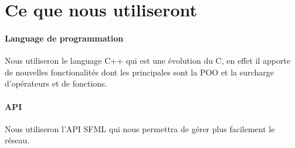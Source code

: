 \documentclass[12pt,a4paper,twoside]{article}
\begin{document}
    \section{Ce que nous utiliseront}

    \paragraph*{Language de programmation\\}
    Nous utiliseron le language C++ qui est une évolution du C, en effet il apporte de nouvelles fonctionalités dont les principales sont la POO et la surcharge d'opérateurs et de fonctions.

    \paragraph*{API\\}
    Nous utiliseron l'API SFML qui nous permettra de gérer plus facilement le réseau.\\
\end{document}
